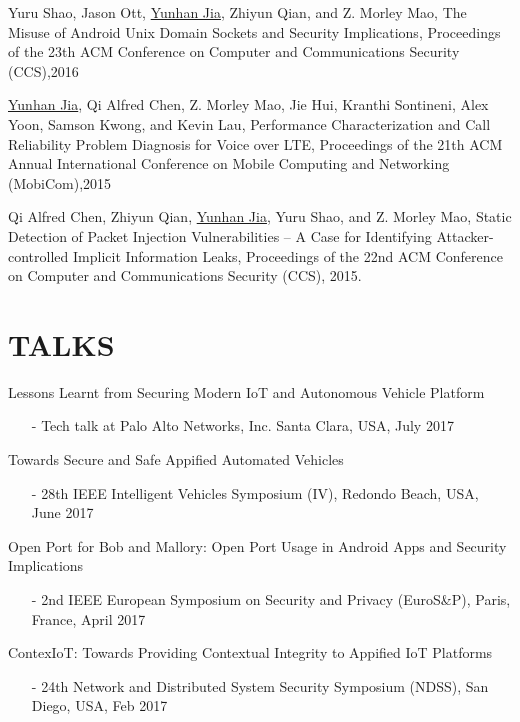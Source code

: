 \documentclass[margin]{res}
\begin{document}
\begin{resume}
Yuru Shao, Jason Ott, \underline{Yunhan Jia}, Zhiyun Qian, and Z. Morley Mao,
The Misuse of Android Unix Domain Sockets and Security Implications, Proceedings of the 23th ACM Conference on Computer and Communications Security (CCS),2016 \href{http://web.eecs.umich.edu/\~jackjia/material/misuse\_ccs16.pdf}{\color{blue}{[PDF]}}

\underline{Yunhan Jia}, Qi Alfred Chen, Z. Morley Mao, Jie Hui, Kranthi Sontineni, Alex Yoon, Samson Kwong, and Kevin Lau, 
Performance Characterization and Call Reliability Problem Diagnosis for Voice over LTE, Proceedings of the 21th ACM Annual 
International Conference on Mobile Computing and Networking (MobiCom),2015 \href{http://web.eecs.umich.edu/\~jackjia/material/performance\_mobicom15.pdf}{\color{blue}{[PDF]}}

Qi Alfred Chen, Zhiyun Qian, \underline{Yunhan Jia}, Yuru Shao, and Z. Morley Mao, Static Detection of Packet Injection
Vulnerabilities -- A Case for Identifying Attacker-controlled Implicit Information Leaks, Proceedings of the 22nd ACM
Conference on Computer and Communications Security (CCS), 2015. \href{http://web.eecs.umich.edu/\~jackjia/material/static\_ccs15.pdf}{\color{blue}{[PDF]}}

\section{TALKS}

Lessons Learnt from Securing Modern IoT and Autonomous Vehicle Platform
\begin{itemize}
    \item[-] Tech talk at Palo Alto Networks, Inc. Santa Clara, USA, July 2017
\end{itemize}

Towards Secure and Safe Appified Automated Vehicles
\begin{itemize}
	\item[-] 28th IEEE Intelligent Vehicles Symposium (IV), Redondo Beach, USA, June 2017
\end{itemize}

Open Port for Bob and Mallory: Open Port Usage in Android Apps and Security Implications
\begin{itemize}
	\item[-] 2nd IEEE European Symposium on Security and Privacy (EuroS\&P), Paris, France, April 2017
\end{itemize}

ContexIoT: Towards Providing Contextual Integrity to Appified IoT Platforms
\begin{itemize}
	\item[-] 24th Network and Distributed System Security Symposium (NDSS), San Diego, USA, Feb 2017
\end{itemize}


\end{resume}
\end{document}
